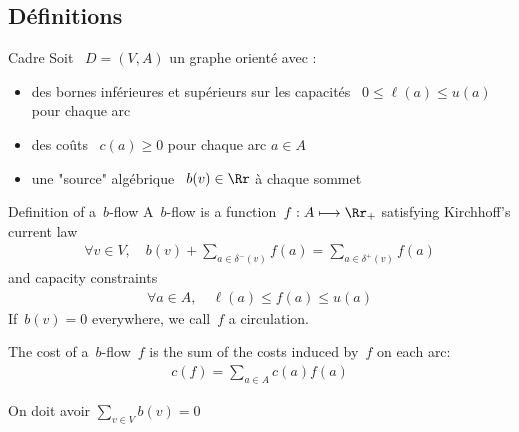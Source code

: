 \documentclass{beamer}
\begin{document}
\subsection{Définitions}

\begin{frame}[t]{Cadre}  \pause
Soit ~$D = (V, A)$ un graphe orienté avec : \pause
\begin{itemize}
  \item des bornes inférieures et supérieurs sur les capacités ~$0 \leq \ell(a) \leq u(a)$ pour chaque arc \pause
  \item des coûts ~$c(a) \geq 0$ pour chaque arc $a \in A$ \pause
  \item une "source" algébrique ~$b(v) \in \Rr$ à chaque sommet
\end{itemize}

\end{frame}

\begin{frame}[t]{Definition of a~$b$-flow} \pause
  A~$b$-flow is a function~$f: A \longmapsto \Rr_+$ satisfying Kirchhoff's current law
  \begin{align*}
    \forall v \in V, \quad b(v) + \sum_{a \in \delta^-(v)} f(a) = \sum_{a \in \delta^+(v)} f(a)
  \end{align*} \pause
  and capacity constraints
  \begin{align*}
    \forall a \in A, \quad \ell(a) \leq f(a) \leq u(a)
  \end{align*} \pause
  If~$b(v) = 0$ everywhere, we call~$f$ a circulation.
  
  \medskip \pause
  
  The cost of a~$b$-flow~$f$ is the sum of the costs induced by~$f$ on each arc:
  \begin{align*}
    c(f) = \sum_{a \in A} c(a) f(a)
  \end{align*}

  On doit avoir 
$\sum_{v \in V} b(v) = 0$
\end{frame}
\end{document}
